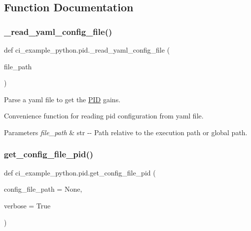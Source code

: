 \subsection{Function Documentation}
\mbox{\label{namespaceci__example__python_1_1pid_ae3cae0234e7c25f408cddd004494c5ca}} 
\subsubsection{\texorpdfstring{\+\_\+read\+\_\+yaml\+\_\+config\+\_\+file()}{\_read\_yaml\_config\_file()}}
{\footnotesize\ttfamily def ci\+\_\+example\+\_\+python.\+pid.\+\_\+read\+\_\+yaml\+\_\+config\+\_\+file (\begin{DoxyParamCaption}\item[{}]{file\+\_\+path }\end{DoxyParamCaption})\hspace{0.3cm}{\ttfamily [private]}}



Parse a yaml file to get the \hyperlink{classci__example__python_1_1pid_1_1PID}{P\+ID} gains. 

Convenience function for reading pid configuration from yaml file.


\begin{DoxyParams}{Parameters}
{\em file\+\_\+path} & str {\ttfamily -\/-\/} Path relative to the execution path or global path. \\
\hline
\end{DoxyParams}
\mbox{\label{namespaceci__example__python_1_1pid_a18376955fadc78cf60e9836c120adc9a}} 
\subsubsection{\texorpdfstring{get\+\_\+config\+\_\+file\+\_\+pid()}{get\_config\_file\_pid()}}
{\footnotesize\ttfamily def ci\+\_\+example\+\_\+python.\+pid.\+get\+\_\+config\+\_\+file\+\_\+pid (\begin{DoxyParamCaption}\item[{}]{config\+\_\+file\+\_\+path = {\ttfamily None},  }\item[{}]{verbose = {\ttfamily True} }\end{DoxyParamCaption})}



